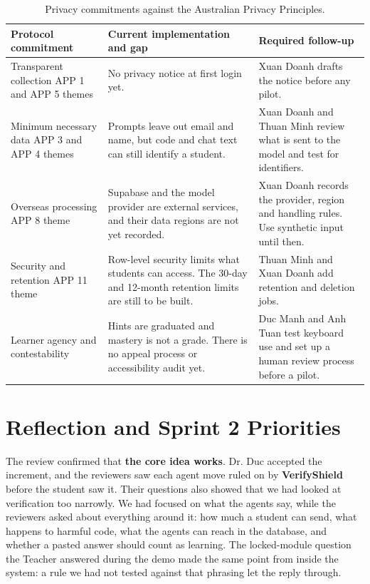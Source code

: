 \documentclass[11pt,a4paper]{article}
\begin{document}
{\small
\begin{longtable}{>{\raggedright\arraybackslash}p{}>{\raggedright\arraybackslash}p{}>{\raggedright\arraybackslash}p{}}
\caption{Privacy commitments against the Australian Privacy Principles.}\\
\toprule
\textbf{Protocol commitment} & \textbf{Current implementation and gap} & \textbf{Required follow-up} \\
\midrule
\endhead
Transparent collection \newline APP 1 and APP 5 themes & No privacy notice at first login yet. & Xuan Doanh drafts the notice before any pilot. \\
Minimum necessary data \newline APP 3 and APP 4 themes & Prompts leave out email and name, but code and chat text can still identify a student. & Xuan Doanh and Thuan Minh review what is sent to the model and test for identifiers. \\
Overseas processing \newline APP 8 theme & Supabase and the model provider are external services, and their data regions are not yet recorded. & Xuan Doanh records the provider, region and handling rules. Use synthetic input until then. \\
Security and retention \newline APP 11 theme & Row-level security limits what students can access. The 30-day and 12-month retention limits are still to be built. & Thuan Minh and Xuan Doanh add retention and deletion jobs. \\
Learner agency and contestability & Hints are graduated and mastery is not a grade. There is no appeal process or accessibility audit yet. & Duc Manh and Anh Tuan test keyboard use and set up a human review process before a pilot. \\
\bottomrule
\end{longtable}}
\section{Reflection and Sprint 2 Priorities}
The review confirmed that \textbf{the core idea works}. Dr. Duc accepted the increment, and the reviewers saw each agent move ruled on by \textbf{VerifyShield }before the student saw it. Their questions also showed that we had looked at verification too narrowly. We had focused on what the agents say, while the reviewers asked about everything around it: how much a student can send, what happens to harmful code, what the agents can reach in the database, and whether a pasted answer should count as learning. The locked-module question the Teacher answered during the demo made the same point from inside the system: a rule we had not tested against that phrasing let the reply through.
\end{document}
